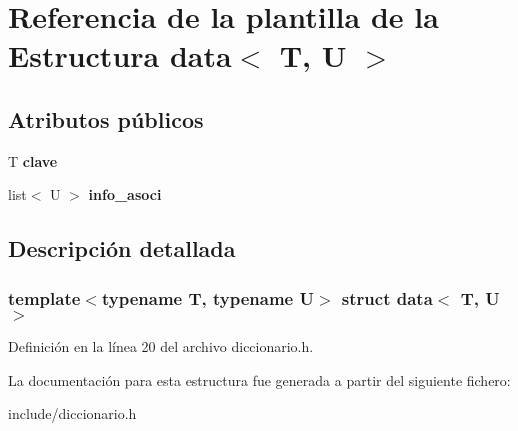 \hypertarget{structdata}{}\section{Referencia de la plantilla de la Estructura data$<$ T, U $>$}
\label{structdata}
\subsection*{Atributos públicos}
\begin{DoxyCompactItemize}
\item 
\mbox{\label{structdata_aa3298b9b021e026f8663005d2fc19e1a}} 
T {\bfseries clave}
\item 
\mbox{\label{structdata_a8299bf6975cfaffbb2354a65881e16a2}} 
list$<$ U $>$ {\bfseries info\+\_\+asoci}
\end{DoxyCompactItemize}


\subsection{Descripción detallada}
\subsubsection*{template$<$typename T, typename U$>$\newline
struct data$<$ T, U $>$}



Definición en la línea 20 del archivo diccionario.\+h.



La documentación para esta estructura fue generada a partir del siguiente fichero\+:\begin{DoxyCompactItemize}
\item 
include/diccionario.\+h\end{DoxyCompactItemize}
